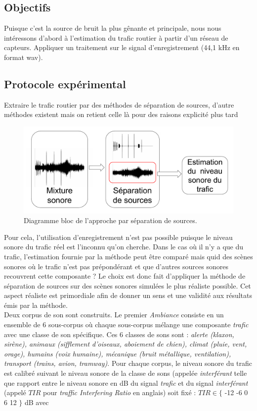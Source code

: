 \subsection{Objectifs}
Puisque c'est la source de bruit la plus gênante et principale, nous nous intéressons d'abord à l'estimation du trafic routier à partir d'un réseau de capteurs.
Appliquer un traitement sur le signal d'enregistrement (44,1 kHz en format wav).

\subsection{Protocole expérimental}

Extraire le trafic routier par des méthodes de séparation de sources, d'autre méthodes existent mais on retient celle là pour des raisons explicité plus tard

\begin{figure}[t]
\centering
\includegraphics[width=0.7\linewidth]{./figures/NMF/bloc_diagram_source_separation.pdf}
\caption{Diagramme bloc de l'approche par séparation de sources.}
\end{figure}


Pour cela, l'utilisation d'enregistrement n'est pas possible puisque le niveau sonore du trafic réel est l'inconnu qu'on cherche. Dans le cas où il n'y a que du trafic, l'estimation fournie par la méthode peut être comparé mais quid des scènes sonores où le trafic n'est pas prépondérant et que d'autres sources sonores recouvrent cette composante ?
Le choix est donc fait d'appliquer la méthode de séparation de sources sur des scènes sonores simulées le plus réaliste possible. Cet aspect réaliste est primordiale afin de donner un sens et une validité aux résultats émis par la méthode.\\


Deux corpus de son sont construits. Le premier \textit{Ambiance} consiste en un ensemble de 6 sous-corpus où chaque sous-corpus mélange une composante \textit{trafic} avec une classe de son spécifique. Ces 6 classes de sons sont : \textit{alerte (klaxon, sirène), animaux (sifflement d'oiseaux, aboiement de chien), climat (pluie, vent, orage), humains (voix humaine), mécanique (bruit métallique, ventilation), transport (trains, avion, tramway)}. Pour chaque corpus, le niveau sonore du trafic est calibré suivant le niveau sonore de la classe de sons (appelée \textit{interférant} telle que rapport entre le niveau sonore en dB du signal \textit{trafic} et du signal \textit{interférant} (appelé $TIR$ pour \textit{traffic Interfering Ratio} en anglais) soit fixé : $TIR \in \lbrace$ -12 -6 0 6 12 $\rbrace$ dB avec 

